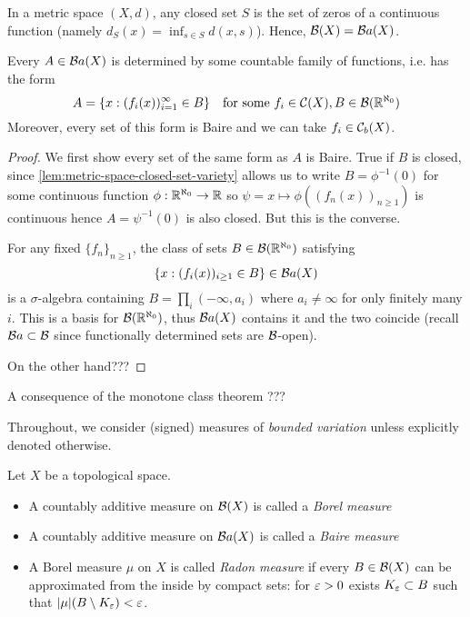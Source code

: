 \begin{lemma}
  \label{lem:metric-space-closed-set-variety}
  In a metric space $(X, d)$, any closed set $S$ is the set of zeros of a continuous
  function (namely $d_S(x) = \inf_{s \in S} d(x,s)$).
  Hence, $\mathcal{B}(X) = \mathcal{B}a(X)$.
\end{lemma}

\begin{lemma}
  Every $A \in \mathcal{B}a(X)$ is determined by some countable family of functions,
  i.e. has the form
  \[
  A = \{x : (f_i(x))_{i=1}^\infty \in B \}
  \quad\text{for some}~f_i \in \mathcal{C}(X), B \in \mathcal{B}(\mathbb{R}^{\aleph_0})
  \]
  Moreover, every set of this form is Baire and
  we can take $f_i \in \mathcal{C}_b(X)$.
\end{lemma}

\begin{proof}
  We first show every set of the same form as $A$ is Baire.
  True if $B$ is closed, since \cref{lem:metric-space-closed-set-variety}
  allows us to write $B = \phi^{-1}(0)$ for some continuous function $\phi :
  \mathbb{R}^{\aleph_0} \to \mathbb{R}$ so $\psi = x \mapsto \phi((f_n(x))_{n \geq 1})$ is
  continuous hence $A = \psi^{-1}(0)$ is also closed. But this is the converse.

  For any fixed $\{f_n\}_{n \geq 1}$, the class of
  sets $B \in \mathcal{B}(\mathbb{R}^{\aleph_0})$ satisfying
  \[
    \{ x : (f_i(x))_{i \geq 1} \in B \} \in \mathcal{B}a(X)
  \]
  is a $\sigma$-algebra containing
  $B = \prod_{i} (-\infty, a_i)$
  where $a_i \neq \infty$ for only finitely many $i$.
  This is a basis for $\mathcal{B}(\mathbb{R}^{\aleph_0})$, thus $\mathcal{B}a(X)$
  contains it and the two coincide (recall $\mathcal{B}a \subset \mathcal{B}$ since
  functionally determined sets are $\mathcal{B}$-open).

  On the other hand???
\end{proof}

A consequence of the monotone class theorem ???

Throughout, we consider (signed) measures of \emph{bounded variation}
unless explicitly denoted otherwise.

\begin{definition}
  Let $X$ be a topological space.
  \begin{itemize}
    \item A countably additive measure on $\mathcal{B}(X)$ is called a
      \emph{Borel measure}
    \item A countably additive measure on $\mathcal{B} a(X)$ is called a
      \emph{Baire measure}
    \item A Borel measure $\mu$ on $X$ is called \emph{Radon measure}
      if every $B \in \mathcal{B}(X)$ can be approximated from the inside
      by compact sets: for $\varepsilon > 0$ exists $K_\varepsilon \subset B$
      such that $\lvert \mu \rvert(B \setminus K_\varepsilon) < \varepsilon$.
  \end{itemize}
\end{definition}

